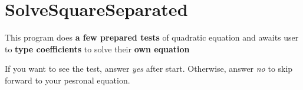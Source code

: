 \chapter{Solve\+Square\+Separated}
\hypertarget{md__r_e_a_d_m_e}{}\label{md__r_e_a_d_m_e}
\label{md__r_e_a_d_m_e_autotoc_md0}%
%
This program does {\bfseries{a few prepared tests}} of quadratic equation and awaits user to {\bfseries{type coefficients}} to solve their {\bfseries{own equation}}

If you want to see the test, answer {\itshape yes} after start. Otherwise, answer {\itshape no} to skip forward to your pesronal equation. 